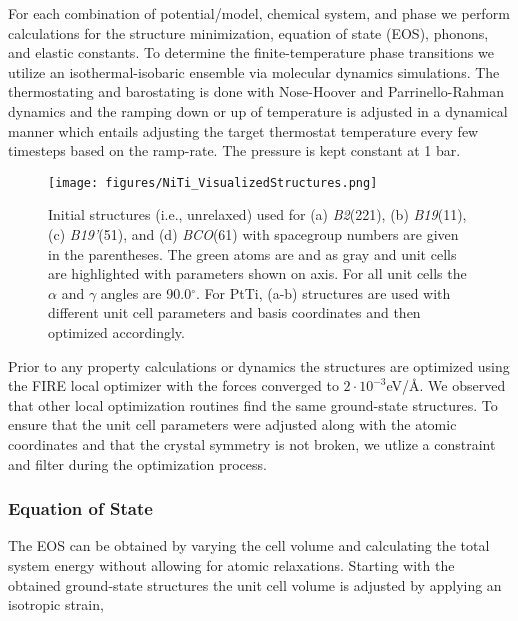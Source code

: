 \documentclass[preprint,colorlinks=true,linkcolor=black,citecolor=black]{elsarticle}
\begin{document}
For each combination of potential/model, chemical system, and phase we
perform calculations for the structure minimization, equation of state
(EOS), phonons, and elastic constants. To determine the
finite-temperature phase transitions we utilize an isothermal-isobaric
ensemble via molecular dynamics simulations. The thermostating and
barostating is done with Nose-Hoover and Parrinello-Rahman dynamics
and the ramping down or up of temperature is adjusted in a dynamical
manner which entails adjusting the target thermostat temperature every
few timesteps based on the ramp-rate. The pressure is kept constant at
1 bar.

\begin{figure}[ht!]
	\begin{centering}
		\texttt{[image: figures/NiTi\_VisualizedStructures.png]}
		\caption{ Initial  structures (i.e., unrelaxed) used for
			(a) \textit{B2}(221), (b) \textit{B19}(11), (c)
			\textit{B19'}(51), and (d) \textit{BCO}(61) with spacegroup
			numbers are given in the parentheses. The green atoms are
			 and  as gray and unit cells are highlighted with
			parameters shown on axis. For all unit cells the $\alpha$ and
			$\gamma$ angles are 90.0$^\circ$. For PtTi, (a-b) structures are
			used with different unit cell parameters and basis coordinates
			and then optimized accordingly.  }
		\label{fig:niti_structures}
	\end{centering}
\end{figure}

Prior to any property calculations or dynamics the structures are
optimized using the FIRE\cite{Bitzek2006} local optimizer with the
forces converged to $2\cdot 10^{-3}$eV/\AA\@. We observed that other
local optimization routines find the same ground-state structures. To
ensure that the unit cell parameters were adjusted along with the
atomic coordinates and that the crystal symmetry is not broken, we
utlize a constraint and filter during the optimization process. \par

\subsubsection{Equation of State}
The EOS can be obtained by varying the cell volume and calculating the
total system energy without allowing for atomic relaxations. Starting
with the obtained ground-state structures the unit cell volume is
adjusted by applying an isotropic strain,
\end{document}
